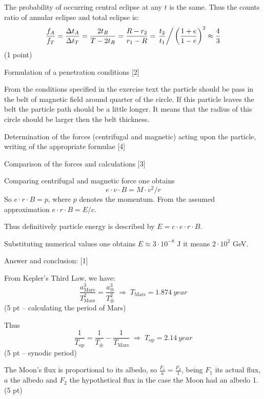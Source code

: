 The probability of occurring central eclipse at any $t$ is the same. Thus the
counts ratio of annular eclipse and total eclipse is:
\[
\frac{f_A}{f_T} = \frac{\Delta t_A}{\Delta t_T} = \frac{2t_R}{T-2t_R}
 = \frac{R-r_2}{r_1-R}
 = \left.\frac{t_2}{t_1}\right/\left(\frac{1+e}{1-e}\right)^2
 \approx \frac{4}{3}
\]
\hfill(1 point)

Formulation of a penetration conditions \hfill[2]

From the conditions specified in the exercise text the particle should be pass in the belt of
magnetic field around quarter of the circle. If this particle leaves the belt the particle path
should be a little longer. It means that the radius of this circle should be larger then the belt
thickness.

Determination of the forces (centrifugal and magnetic) acting upon the particle, writing of the
appropriate formulae \hfill[4]

Comparison of the forces and calculations \hfill[3]

Comparing centrifugal and magnetic force one obtains
\[
e \cdot v \cdot B = M \cdot v^2 / r
\]
So $e \cdot r \cdot B = p$, where $p$ denotes the momentum. From the assumed approximation
$e \cdot r \cdot B = E / c$.

Thus definitively particle energy is described by $E = c \cdot e \cdot r \cdot B$.

Substituting numerical values one obtains $E \approx 3\cdot10^{-8}$ J it means
$2\cdot10^{2}$ GeV.

Answer and conclusion: \hfill[1]


From Kepler's Third Law, we have:
\[
\frac{a_{\mathrm{Mars}}^3}{T_{\mathrm{Mars}}^2} = \frac{a_\oplus^3}{T_\oplus^2}
\;\Rightarrow\; T_{\mathrm{Mars}} = 1.874\ year
\]
\hfill(5 pt -- calculating the period of Mars)

Thus
\[
\frac{1}{T_{\mathrm{op}}} = \frac{1}{T_\oplus} - \frac{1}{T_{\mathrm{Mars}}}
\;\Rightarrow\; T_{\mathrm{op}} = 2.14\ year
\]
\hfill(5 pt -- synodic period)

The Moon's flux is proportional to its albedo, so $\frac{F_1}{a} = \frac{F_2}{1}$,
being $F_1$ its actual flux, $a$ the albedo and $F_2$ the hypothetical flux in
the case the Moon had an albedo 1. \hfill(5 pt)

